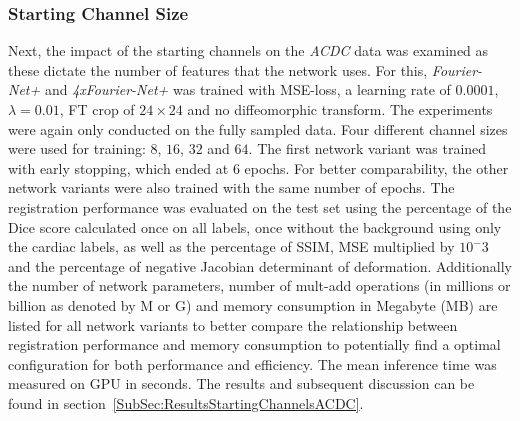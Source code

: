 \documentclass[english,version-2022-01]{uzl-thesis} %
\begin{document}
\subsubsection{Starting Channel Size} \label{SubSubSec:StartingChannelsACDC}
Next, the impact of the starting channels on the \emph{ACDC} data was examined as these dictate the number of features that the network uses. For this, \emph{Fourier-Net+} and \emph{4xFourier-Net+} was trained with MSE-loss, a learning rate of $0.0001$, $\lambda = 0.01$, FT crop of $24 \times 24$ and no diffeomorphic transform. The experiments were again only conducted on the fully sampled data. Four different channel sizes were used for training: $8$, $16$, $32$ and $64$. The first network variant was trained with early stopping, which ended at 6 epochs. For better comparability, the other network variants were also trained with the same number of epochs. The registration performance was evaluated on the test set using the percentage of the Dice score calculated once on all labels, once without the background using only the cardiac labels, as well as the percentage of SSIM, MSE multiplied by $10^-3$ and the percentage of negative Jacobian determinant of deformation. Additionally the number of network parameters, number of mult-add operations (in millions or billion as denoted by M or G) and memory consumption in Megabyte (MB) are listed for all network variants to better compare the relationship between registration performance and memory consumption to potentially find a optimal configuration for both performance and efficiency. The mean inference time was measured on GPU in seconds. The results and subsequent discussion can be found in section~\ref{SubSec:ResultsStartingChannelsACDC}.
\end{document}
